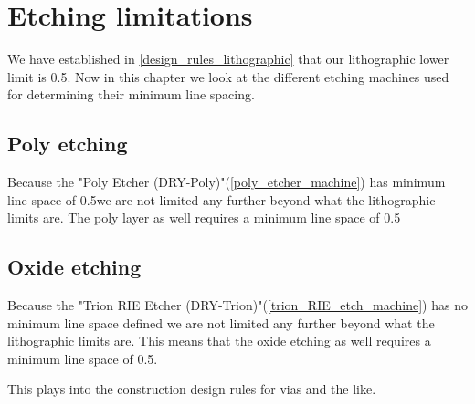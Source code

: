 \section{Etching limitations}
We have established in \autoref{design_rules_lithographic} that our lithographic lower limit is 0.5\um.
Now in this chapter we look at the different etching machines used for determining their minimum line spacing.

\subsection{Poly etching}
Because the "Poly Etcher (DRY-Poly)"(\autoref{poly_etcher_machine}) has minimum line space of 0.5\um we are not limited any further beyond what the lithographic limits are.
The poly layer as well requires a minimum line space of 0.5\um

\subsection{Oxide etching}
Because the "Trion RIE Etcher (DRY-Trion)"(\autoref{trion_RIE_etch_machine}) has no minimum line space defined we are not limited any further beyond what the lithographic limits are.
This means that the oxide etching as well requires a minimum line space of 0.5\um.

This plays into the construction design rules for vias and the like.
